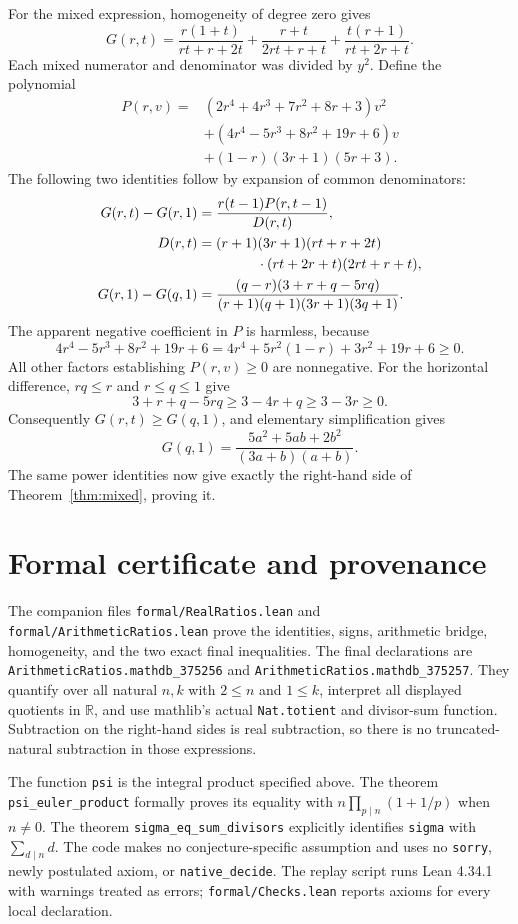 \documentclass[11pt]{article}
\newcommand{\RR}{\mathbb R}
\begin{document}
For the mixed expression, homogeneity of degree zero gives
\[
 G(r,t)=\frac{r(1+t)}{rt+r+2t}
       +\frac{r+t}{2rt+r+t}
       +\frac{t(r+1)}{rt+2r+t}.
\]
Each mixed numerator and denominator was divided by $y^2$.
Define the polynomial
\begin{align*}
P(r,v)={}&(2r^4+4r^3+7r^2+8r+3)v^2\\
 &+(4r^4-5r^3+8r^2+19r+6)v\\
 &+(1-r)(3r+1)(5r+3).
\end{align*}
The following two identities follow by expansion of common denominators:
\begin{align*}
G(r,t)-G(r,1)
 &=\frac{r(t-1)P(r,t-1)}{D(r,t)},\\
D(r,t)&=(r+1)(3r+1)(rt+r+2t)\\
 &\hspace{15mm}\cdot(rt+2r+t)(2rt+r+t),\\
G(r,1)-G(q,1)
 &=\frac{(q-r)(3+r+q-5rq)}
 {(r+1)(q+1)(3r+1)(3q+1)}.
\end{align*}
The apparent negative coefficient in $P$ is harmless, because
\[
4r^4-5r^3+8r^2+19r+6
=4r^4+5r^2(1-r)+3r^2+19r+6\geq0.
\]
All other factors establishing $P(r,v)\geq0$ are nonnegative.
For the horizontal difference, $rq\leq r$ and $r\leq q\leq1$ give
\[
3+r+q-5rq\geq3-4r+q\geq3-3r\geq0.
\]
Consequently $G(r,t)\geq G(q,1)$, and elementary simplification gives
\[
G(q,1)=\frac{5a^2+5ab+2b^2}{(3a+b)(a+b)}.
\]
The same power identities now give exactly the right-hand side of
Theorem~\ref{thm:mixed}, proving it.

\small
\section{Formal certificate and provenance}
The companion files \texttt{formal/RealRatios.lean} and
\texttt{formal/ArithmeticRatios.lean} prove the identities, signs,
arithmetic bridge, homogeneity, and the two exact final inequalities.
The final declarations are
\texttt{ArithmeticRatios.mathdb\_375256} and
\texttt{ArithmeticRatios.mathdb\_375257}.
They quantify over all natural $n,k$ with $2\leq n$ and $1\leq k$,
interpret all displayed quotients in $\RR$, and use mathlib's actual
\texttt{Nat.totient} and divisor-sum function. Subtraction on the
right-hand sides is real subtraction, so there is no truncated-natural
subtraction in those expressions.

The function \texttt{psi} is the integral product specified above.
The theorem \texttt{psi\_euler\_product} formally proves its equality
with $n\prod_{p\mid n}(1+1/p)$ when $n\ne0$.
The theorem \texttt{sigma\_eq\_sum\_divisors} explicitly identifies
\texttt{sigma} with $\sum_{d\mid n}d$.
The code makes no conjecture-specific assumption and uses no
\texttt{sorry}, newly postulated axiom, or \texttt{native\_decide}.
The replay script runs Lean 4.34.1 with warnings treated as errors;
\texttt{formal/Checks.lean} reports axioms for every local declaration.
\end{document}
